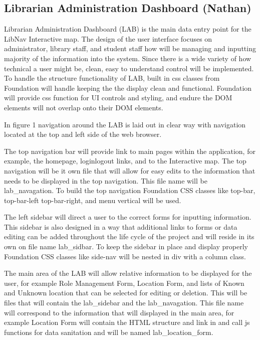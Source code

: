 \documentclass[letterpaper,10pt,titlepage, onecolumn, compsoc]{IEEEtran}
\begin{document}
\subsection{Librarian Administration Dashboard (Nathan)}
Librarian Administration Dashboard (LAB) is the main data entry point for the LibNav Interactive map. The design of the user interface focuses on administrator, library staff, and student staff how will be managing and inputting majority of the information into the system. Since there is a wide variety of how technical a user might be, clean, easy to understand control will be implemented. To handle the structure functionality of LAB, built in css classes from Foundation will handle keeping the the display clean and functional. Foundation will provide css function for UI controls and styling, and endure the DOM elements will not overlap onto their DOM elements.

In figure 1 navigation around the LAB is laid out in clear way with navigation located at the top and left side of the web browser. 

The top navigation bar will provide link to main pages within the application, for example, the homepage, login\/logout links, and to the Interactive map. The top navigation will be it own file that will allow for easy edits to the information that needs to be displayed in the top navigation. This file name will be lab\_navagation. To build the top navigation Foundation CSS classes like top-bar, top-bar-left top-bar-right, and menu vertical will be used. 

The left sidebar will direct a user to the correct forms for inputting information. This sidebar is also designed in a way that additional links to forms or data editing can be added throughout the life cycle of the project and will reside in its own on file name lab\_sidbar. To keep the sidebar in place and display properly Foundation CSS classes like side-nav will be nested in div with a column class.

The main area of the LAB will allow relative information to be displayed for the user, for example  Role Management Form, Location Form, and lists of Known and Unknown location that can be selected for editing or deletion. This will be files that will contain the lab\_sidebar and the lab\_navagation. This file name will correspond to the information that will displayed in the main area, for example Location Form will contain the HTML structure and link in and call js functions for data sanitation and will be named lab\_location\_form.
\end{document}
